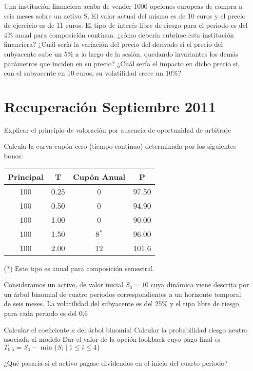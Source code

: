 \begin{problem}[4]
Una institución financiera acaba de vender 1000 opciones europeas de compra a seis meses sobre
un activo S. El valor actual del mismo es de 10 euros y el precio de ejercicio es de 11 euros. El tipo
de interés libre de riesgo para el periodo es del 4\% anual para composición continua.
\ppart ¿cómo debería cubrirse esta institución financiera?
\ppart ¿Cuál sería la variación del precio del derivado si el precio del subyacente sube un 5\% a lo largo de la sesión, quedando invariantes los demás parámetros que inciden en su precio?
\ppart ¿Cuál sería el impacto en dicho precio si, con el subyacente en 10 euros, su volatilidad crece un 10\%?

\solution
\end{problem}

\section{Recuperación Septiembre 2011}
\begin{problem}[1]
Explicar el principio de valoración por ausencia de oportunidad de arbitraje
\solution
\end{problem}

\begin{problem}[2]
Calcula la curva cupón-cero (tiempo continuo) determinada por los siguientes bonos:

\begin{center}
\begin{tabular}{cccc}
\hline
\textbf{Principal} & \textbf{T} & \textbf{Cupón Anual} & \textbf{P} \\
\hline
100 & 0.25 & 0 & 97.50\\
100 & 0.50 & 0 & 94.90\\
100 & 1.00 & 0 & 90.00\\
100 & 1.50 & 8$^*$ & 96.00\\
100 & 2.00 & 12 & 101.6\\
\hline
\end{tabular}
\end{center}
(*) Este tipo es anual para composición semestral.
\solution

\end{problem}

\begin{problem}[3]
Consideramos un activo, de valor inicial $S_0 = 10$ cuya dinámica viene descrita por un árbol binomial
de cuatro periodos correspondientes a un horizonte temporal de seis meses. La volatilidad del
subyacente es del 25\% y el tipo libre de riesgo para cada periodo es del 0,6%

\ppart Calcular el coeficiente $a$ del árbol binomial
\ppart Calcular la probabilidad riesgo neutro asociada al modelo
\ppart Dar el valor de la opción lookback cuyo pago final es $T_{0.5}=S_4-\min\{S_i \mid 1 \leq i \leq 4\}$

\ppart ¿Qué pasaría si el activo pagase dividendos en el inicio del cuarto periodo?
\solution

\end{problem}

